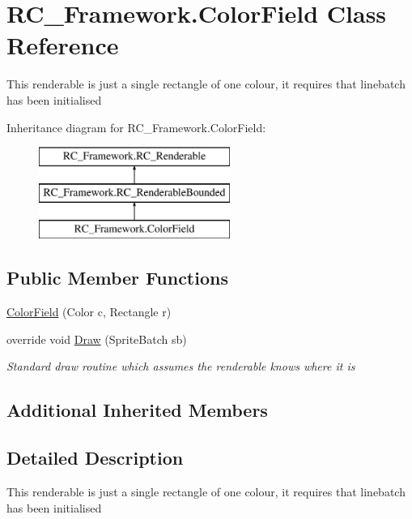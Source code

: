 \hypertarget{class_r_c___framework_1_1_color_field}{}\section{R\+C\+\_\+\+Framework.\+Color\+Field Class Reference}
\label{class_r_c___framework_1_1_color_field}


This renderable is just a single rectangle of one colour, it requires that linebatch has been initialised  


Inheritance diagram for R\+C\+\_\+\+Framework.\+Color\+Field\+:\begin{figure}[H]
\begin{center}
\leavevmode
\includegraphics[height=3.000000cm]{class_r_c___framework_1_1_color_field}
\end{center}
\end{figure}
\subsection*{Public Member Functions}
\begin{DoxyCompactItemize}
\item 
\mbox{\hyperlink{class_r_c___framework_1_1_color_field_a57a40b1e28053b1b8482a4aef40dcd4d}{Color\+Field}} (Color c, Rectangle r)
\item 
override void \mbox{\hyperlink{class_r_c___framework_1_1_color_field_a431503895c3a851dc8ca6586dd4686fe}{Draw}} (Sprite\+Batch sb)
\begin{DoxyCompactList}\small\item\em Standard draw routine which assumes the renderable knows where it is \end{DoxyCompactList}\end{DoxyCompactItemize}
\subsection*{Additional Inherited Members}


\subsection{Detailed Description}
This renderable is just a single rectangle of one colour, it requires that linebatch has been initialised 



